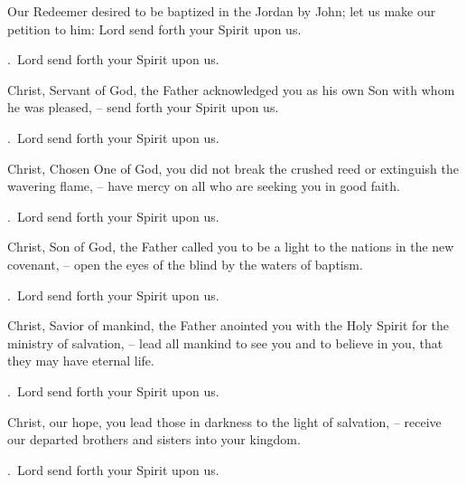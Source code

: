 \lettrine[loversize=0.15,lines=2]{O}{}ur Redeemer desired to be baptized in the Jordan by John; let us make our petition to him: Lord send forth your Spirit upon us.
\par \Rbar.~Lord send forth your Spirit upon us.

Christ, Servant of God, the Father acknowledged you as his own Son with whom he was pleased,
– send forth your Spirit upon us.
\par \Rbar.~Lord send forth your Spirit upon us.

Christ, Chosen One of God, you did not break the crushed reed or extinguish the wavering flame,
– have mercy on all who are seeking you in good faith.
\par \Rbar.~Lord send forth your Spirit upon us.

Christ, Son of God, the Father called you to be a light to the nations in the new covenant,
– open the eyes of the blind by the waters of baptism.
\par \Rbar.~Lord send forth your Spirit upon us.

Christ, Savior of mankind, the Father anointed you with the Holy Spirit for the ministry of salvation,
– lead all mankind to see you and to believe in you, that they may have eternal life.
\par \Rbar.~Lord send forth your Spirit upon us.

Christ, our hope, you lead those in darkness to the light of salvation,
– receive our departed brothers and sisters into your kingdom.
\par \Rbar.~Lord send forth your Spirit upon us.
